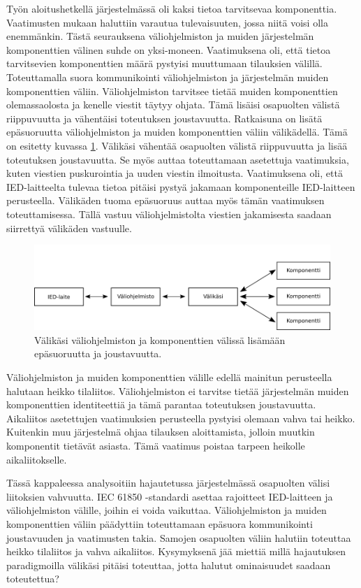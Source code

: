 Työn aloitushetkellä järjestelmässä oli kaksi tietoa tarvitsevaa komponenttia. Vaatimusten mukaan haluttiin varautua tulevaisuuten, jossa niitä voisi olla enemmänkin. Tästä seurauksena väliohjelmiston ja muiden järjestelmän komponenttien välinen suhde on yksi-moneen. Vaatimuksena oli, että tietoa tarvitsevien komponenttien määrä pystyisi muuttumaan tilauksien välillä. Toteuttamalla suora kommunikointi väliohjelmiston ja järjestelmän muiden komponenttien väliin. Väliohjelmiston tarvitsee tietää muiden komponenttien olemassaolosta ja kenelle viestit täytyy ohjata. Tämä lisäisi osapuolten välistä riippuvuutta ja vähentäisi toteutuksen joustavuutta. Ratkaisuna on lisätä epäsuoruutta väliohjelmiston ja muiden komponenttien väliin välikädellä. Tämä on esitetty kuvassa \ref{fig:coupling-analysis}. Välikäsi vähentää osapuolten välistä riippuvuutta ja lisää toteutuksen joustavuutta. Se myös auttaa toteuttamaan asetettuja vaatimuksia, kuten viestien puskurointia ja uuden viestin ilmoitusta. Vaatimuksena oli, että IED-laitteelta tulevaa tietoa pitäisi pystyä jakamaan komponenteille IED-laitteen perusteella. Välikäden tuoma epäsuoruus auttaa myös tämän vaatimuksen toteuttamisessa. Tällä vastuu väliohjelmistolta viestien jakamisesta saadaan siirrettyä välikäden vastuulle.

\begin{figure}[ht!]
	\includegraphics[width=1\textwidth]{pictures/coupling-analysis.png}
	\caption{Välikäsi väliohjelmiston ja komponenttien välissä lisämään epäsuoruutta ja joustavuutta.}
	\label{fig:coupling-analysis}
\end{figure}

Väliohjelmiston ja muiden komponenttien välille edellä mainitun perusteella halutaan heikko tilaliitos. Väliohjelmiston ei tarvitse tietää järjestelmän muiden komponenttien identiteettiä ja tämä parantaa toteutuksen joustavuutta. Aikaliitos asetettujen vaatimuksien perusteella pystyisi olemaan vahva tai heikko. Kuitenkin muu järjestelmä ohjaa tilauksen aloittamista, jolloin muutkin komponentit tietävät asiasta. Tämä vaatimus poistaa tarpeen heikolle aikaliitokselle.

Tässä kappaleessa analysoitiin hajautetussa järjestelmässä osapuolten välisi liitoksien vahvuutta. IEC 61850 -standardi asettaa rajoitteet IED-laitteen ja väliohjelmiston välille, joihin ei voida vaikuttaa. Väliohjelmiston ja muiden komponenttien väliin päädyttiin toteuttamaan epäsuora kommunikointi joustavuuden ja vaatimusten takia. Samojen osapuolten väliin halutiin toteuttaa heikko tilaliitos ja vahva aikaliitos. Kysymyksenä jää miettiä millä hajautuksen paradigmoilla välikäsi pitäisi toteuttaa, jotta halutut ominaisuudet saadaan toteutettua?


